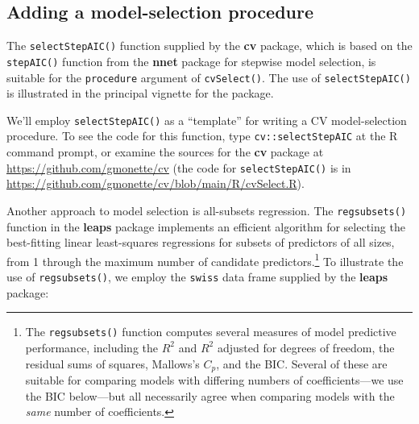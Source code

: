\documentclass[
]{jss}
\begin{document}
\hypertarget{adding-a-model-selection-procedure}{%
\subsection{Adding a model-selection
procedure}\label{adding-a-model-selection-procedure}}

The \texttt{selectStepAIC()} function supplied by the \textbf{cv}
package, which is based on the \texttt{stepAIC()} function from the
\textbf{nnet} package \citep{VenablesRipley:2002} for stepwise model
selection, is suitable for the \texttt{procedure} argument of
\texttt{cvSelect()}. The use of \texttt{selectStepAIC()} is illustrated
in the principal vignette for the package.

We'll employ \texttt{selectStepAIC()} as a ``template'' for writing a CV
model-selection procedure. To see the code for this function, type
\texttt{cv::selectStepAIC} at the R command prompt, or examine the
sources for the \textbf{cv} package at
\url{https://github.com/gmonette/cv} (the code for
\texttt{selectStepAIC()} is in
\url{https://github.com/gmonette/cv/blob/main/R/cvSelect.R}).

Another approach to model selection is all-subsets regression. The
\texttt{regsubsets()} function in the \textbf{leaps} package
\citep{LumleyMiller:2020} implements an efficient algorithm for
selecting the best-fitting linear least-squares regressions for subsets
of predictors of all sizes, from 1 through the maximum number of
candidate predictors.\footnote{The \texttt{regsubsets()} function
  computes several measures of model predictive performance, including
  the \(R^2\) and \(R^2\) adjusted for degrees of freedom, the residual
  sums of squares, Mallows's \(C_p\), and the BIC. Several of these are
  suitable for comparing models with differing numbers of
  coefficients---we use the BIC below---but all necessarily agree when
  comparing models with the \emph{same} number of coefficients.} To
illustrate the use of \texttt{regsubsets()}, we employ the
\texttt{swiss} data frame supplied by the \textbf{leaps} package:
\end{document}
